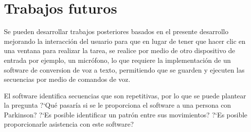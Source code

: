 \section{Trabajos futuros}
Se pueden desarrollar trabajos posteriores basados en el presente desarrollo
 mejorando la interacci\'on del usuario para que en lugar de tener que hacer 
 clic en una ventana para realizar la tarea, se realice por medio de otro 
 dispositivo de entrada por ejemplo, un micr\'ofono, lo que requiere la 
 implementaci\'on de un software de conversion de voz a texto, permitiendo que 
 se guarden y ejecuten las secuencias por medio de comandos de voz. 

El software identifica secuencias que son repetitivas, por lo que se puede
 plantear la pregunta ?`Qu\'e pasar\'ia si se le proporciona el software a una
 persona con Parkinson?  ?`Es posible identificar un patr\'on entre sus 
 movimientos? ?`Es posible proporcionarle asistencia con este software?
